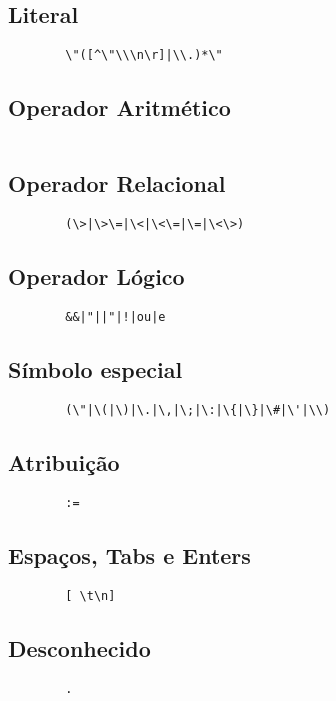 \documentclass[a4paper,10pt]{article}
\begin{document}
	\subsection{Literal}
		\begin{verbatim}
		\"([^\"\\\n\r]|\\.)*\"
		\end{verbatim}

	\subsection{Operador Aritmético}
		\begin{verbatim}
		\end{verbatim}

	\subsection{Operador Relacional}
		\begin{verbatim}
		(\>|\>\=|\<|\<\=|\=|\<\>)
		\end{verbatim}

	\subsection{Operador Lógico}
		\begin{verbatim}
		&&|"||"|!|ou|e
		\end{verbatim}

	\subsection{Símbolo especial}
		\begin{verbatim}
		(\"|\(|\)|\.|\,|\;|\:|\{|\}|\#|\'|\\)
		\end{verbatim}

	\subsection{Atribuição}
		\begin{verbatim}
		:=
		\end{verbatim}

	\subsection{Espaços, Tabs e Enters}
		\begin{verbatim}
		[ \t\n]
		\end{verbatim}

	\subsection{Desconhecido}
		\begin{verbatim}
		.
		\end{verbatim}
\end{document}
